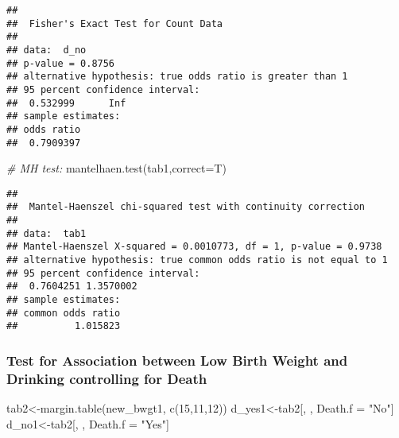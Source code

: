 \documentclass[
]{article}
\newenvironment{Shaded}{\begin{snugshade}}{\end{snugshade}}
\newcommand{\AttributeTok}[1]{\textcolor[rgb]{0.77,0.63,0.00}{#1}}
\newcommand{\CommentTok}[1]{\textcolor[rgb]{0.56,0.35,0.01}{\textit{#1}}}
\newcommand{\DecValTok}[1]{\textcolor[rgb]{0.00,0.00,0.81}{#1}}
\newcommand{\FunctionTok}[1]{\textcolor[rgb]{0.00,0.00,0.00}{#1}}
\newcommand{\NormalTok}[1]{#1}
\newcommand{\OtherTok}[1]{\textcolor[rgb]{0.56,0.35,0.01}{#1}}
\newcommand{\SpecialCharTok}[1]{\textcolor[rgb]{0.00,0.00,0.00}{#1}}
\newcommand{\StringTok}[1]{\textcolor[rgb]{0.31,0.60,0.02}{#1}}
\begin{document}
\begin{verbatim}
## 
##  Fisher's Exact Test for Count Data
## 
## data:  d_no
## p-value = 0.8756
## alternative hypothesis: true odds ratio is greater than 1
## 95 percent confidence interval:
##  0.532999      Inf
## sample estimates:
## odds ratio 
##  0.7909397
\end{verbatim}

\begin{Shaded}
\begin{Highlighting}[]
\CommentTok{\# MH test:}
\FunctionTok{mantelhaen.test}\NormalTok{(tab1,}\AttributeTok{correct=}\NormalTok{T)}
\end{Highlighting}
\end{Shaded}

\begin{verbatim}
## 
##  Mantel-Haenszel chi-squared test with continuity correction
## 
## data:  tab1
## Mantel-Haenszel X-squared = 0.0010773, df = 1, p-value = 0.9738
## alternative hypothesis: true common odds ratio is not equal to 1
## 95 percent confidence interval:
##  0.7604251 1.3570002
## sample estimates:
## common odds ratio 
##          1.015823
\end{verbatim}

\vspace{0.5in}

\hypertarget{test-for-association-between-low-birth-weight-and-drinking-controlling-for-death}{%
\subsubsection{Test for Association between Low Birth Weight and
Drinking controlling for
Death}\label{test-for-association-between-low-birth-weight-and-drinking-controlling-for-death}}

\begin{Shaded}
\begin{Highlighting}[]
\NormalTok{tab2}\OtherTok{\textless{}{-}}\FunctionTok{margin.table}\NormalTok{(new\_bwgt1, }\FunctionTok{c}\NormalTok{(}\DecValTok{15}\NormalTok{,}\DecValTok{11}\NormalTok{,}\DecValTok{12}\NormalTok{))}
\NormalTok{d\_yes1}\OtherTok{\textless{}{-}}\NormalTok{tab2[, , Death.f }\OtherTok{=} \StringTok{"No"}\NormalTok{]}
\NormalTok{d\_no1}\OtherTok{\textless{}{-}}\NormalTok{tab2[, , Death.f }\OtherTok{=} \StringTok{"Yes"}\NormalTok{]}
\end{Highlighting}
\end{Shaded}

\begin{Shaded}
\end{Shaded}
\end{document}
